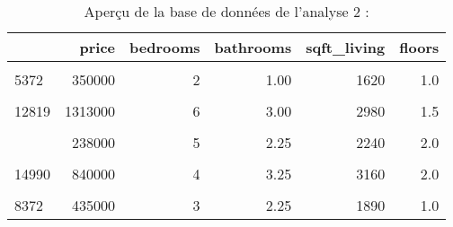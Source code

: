 \documentclass[
  11pt,
  french,
]{article}
\begin{document}
\begin{table}[!h]

\caption{\label{tab:unnamed-chunk-24}Aperçu de la base de données de l'analyse 2 :}
\centering
\begin{tabular}[t]{lrrrrr}
\toprule
  & price & bedrooms & bathrooms & sqft\_living & floors\\
\midrule
\cellcolor{gray!6}{19054} & \cellcolor{gray!6}{879950} & \cellcolor{gray!6}{4} & \cellcolor{gray!6}{2.25} & \cellcolor{gray!6}{3500} & \cellcolor{gray!6}{1.0}\\
5372 & 350000 & 2 & 1.00 & 1620 & 1.0\\
\cellcolor{gray!6}{20600} & \cellcolor{gray!6}{376000} & \cellcolor{gray!6}{3} & \cellcolor{gray!6}{2.00} & \cellcolor{gray!6}{1340} & \cellcolor{gray!6}{3.0}\\
12819 & 1313000 & 6 & 3.00 & 2980 & 1.5\\
\cellcolor{gray!6}{14746} & \cellcolor{gray!6}{355000} & \cellcolor{gray!6}{4} & \cellcolor{gray!6}{2.25} & \cellcolor{gray!6}{2200} & \cellcolor{gray!6}{2.0}\\
\addlinespace
9490 & 238000 & 5 & 2.25 & 2240 & 2.0\\
\cellcolor{gray!6}{2560} & \cellcolor{gray!6}{890000} & \cellcolor{gray!6}{4} & \cellcolor{gray!6}{2.75} & \cellcolor{gray!6}{2610} & \cellcolor{gray!6}{1.0}\\
14990 & 840000 & 4 & 3.25 & 3160 & 2.0\\
\cellcolor{gray!6}{642} & \cellcolor{gray!6}{305000} & \cellcolor{gray!6}{4} & \cellcolor{gray!6}{2.50} & \cellcolor{gray!6}{2250} & \cellcolor{gray!6}{1.0}\\
8372 & 435000 & 3 & 2.25 & 1890 & 1.0\\
\bottomrule
\end{tabular}
\end{table}
\end{document}
